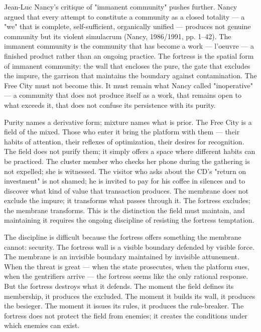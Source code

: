 Jean-Luc Nancy's critique of "immanent community" pushes further. Nancy argued that every attempt to constitute a community as a closed totality — a "we" that is complete, self-sufficient, organically unified — produces not genuine community but its violent simulacrum (Nancy, 1986/1991, pp. 1–42). The immanent community is the community that has become a work — l'oeuvre — a finished product rather than an ongoing practice. The fortress is the spatial form of immanent community: the wall that encloses the pure, the gate that excludes the impure, the garrison that maintains the boundary against contamination. The Free City must not become this. It must remain what Nancy called "inoperative" — a community that does not produce itself as a work, that remains open to what exceeds it, that does not confuse its persistence with its purity.

Purity names a derivative form; mixture names what is prior. The Free City is a field of the mixed. Those who enter it bring the platform with them — their habits of attention, their reflexes of optimization, their desires for recognition. The field does not purify them; it simply offers a space where different habits can be practiced. The cluster member who checks her phone during the gathering is not expelled; she is witnessed. The visitor who asks about the CD's "return on investment" is not shamed; he is invited to pay for his coffee in silences and to discover what kind of value that transaction produces. The membrane does not exclude the impure; it transforms what passes through it. The fortress excludes; the membrane transforms. This is the distinction the field must maintain, and maintaining it requires the ongoing discipline of resisting the fortress temptation.

The discipline is difficult because the fortress offers something the membrane cannot: security. The fortress wall is a visible boundary defended by visible force. The membrane is an invisible boundary maintained by invisible attunement. When the threat is great — when the state prosecutes, when the platform sues, when the gentrifiers arrive — the fortress seems like the only rational response. But the fortress destroys what it defends. The moment the field defines its membership, it produces the excluded. The moment it builds its wall, it produces the besieger. The moment it issues its rules, it produces the rule-breaker. The fortress does not protect the field from enemies; it creates the conditions under which enemies can exist.

